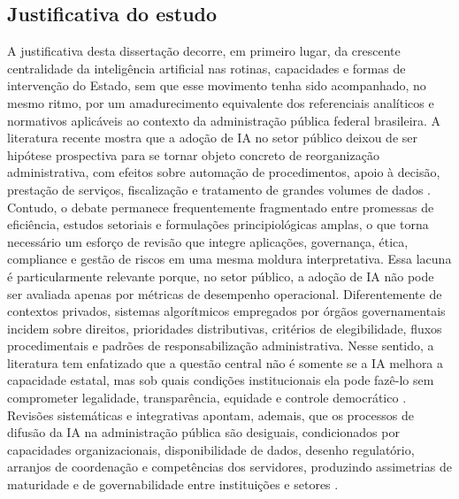 \documentclass[12pt,a4paper]{article}
\begin{document}
\subsection{Justificativa do estudo}
\label{sec:orge07dcc3}
A justificativa desta dissertação decorre, em primeiro lugar, da crescente centralidade da inteligência artificial nas rotinas, capacidades e formas de intervenção do Estado, sem que esse movimento tenha sido acompanhado, no mesmo ritmo, por um amadurecimento equivalente dos referenciais analíticos e normativos aplicáveis ao contexto da administração pública federal brasileira. A literatura recente mostra que a adoção de IA no setor público deixou de ser hipótese prospectiva para se tornar objeto concreto de reorganização administrativa, com efeitos sobre automação de procedimentos, apoio à decisão, prestação de serviços, fiscalização e tratamento de grandes volumes de dados \autocite{madan2022ai} \autocite{serra2024a} \autocite{pi2021machine}. Contudo, o debate permanece frequentemente fragmentado entre promessas de eficiência, estudos setoriais e formulações principiológicas amplas, o que torna necessário um esforço de revisão que integre aplicações, governança, ética, compliance e gestão de riscos em uma mesma moldura interpretativa.
Essa lacuna é particularmente relevante porque, no setor público, a adoção de IA não pode ser avaliada apenas por métricas de desempenho operacional. Diferentemente de contextos privados, sistemas algorítmicos empregados por órgãos governamentais incidem sobre direitos, prioridades distributivas, critérios de elegibilidade, fluxos procedimentais e padrões de responsabilização administrativa. Nesse sentido, a literatura tem enfatizado que a questão central não é somente se a IA melhora a capacidade estatal, mas sob quais condições institucionais ela pode fazê-lo sem comprometer legalidade, transparência, equidade e controle democrático \autocite{criado2024artificial} \autocite{parycek2023artificial}. Revisões sistemáticas e integrativas apontam, ademais, que os processos de difusão da IA na administração pública são desiguais, condicionados por capacidades organizacionais, disponibilidade de dados, desenho regulatório, arranjos de coordenação e competências dos servidores, produzindo assimetrias de maturidade e de governabilidade entre instituições e setores \autocite{madan2022ai} \autocite{mariano2026inteligencia} \autocite{melo2026competencias}.
\end{document}
